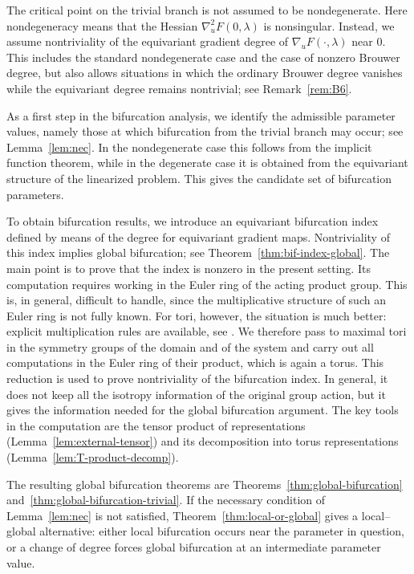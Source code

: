 \documentclass[reqno,twoside,12pt]{amsart}
\numberwithin{equation}{section} \errorcontextlines=0
\begin{document}
The critical point on the trivial branch is not assumed to be nondegenerate. Here nondegeneracy means that the Hessian $\nabla_u^2F(0,\lambda)$ is nonsingular. Instead, we assume nontriviality of the equivariant gradient degree of $\nabla_uF(\cdot,\lambda)$ near $0$. This includes the standard nondegenerate case and the case of nonzero Brouwer degree, but also allows situations in which the ordinary Brouwer degree vanishes while the equivariant degree remains nontrivial; see Remark~\ref{rem:B6}.

As a first step in the bifurcation analysis, we identify the admissible parameter values, namely those at which bifurcation from the trivial branch may occur; see Lemma~\ref{lem:nec}. In the nondegenerate case this follows from the implicit function theorem, while in the degenerate case it is obtained from the equivariant structure of the linearized problem. This gives the candidate set of bifurcation parameters.

To obtain bifurcation results, we introduce an equivariant bifurcation index defined by means of the degree for equivariant gradient maps. Nontriviality of this index implies global bifurcation; see Theorem~\ref{thm:bif-index-global}. The main point is to prove that the index is nonzero in the present setting. Its computation requires working in the Euler ring of the acting product group. This is, in general, difficult to handle, since the multiplicative structure of such an Euler ring is not fully known. For tori, however, the situation is much better: explicit multiplication rules are available, see \cite{GarRyb}. We therefore pass to maximal tori in the symmetry groups of the domain and of the system and carry out all computations in the Euler ring of their product, which is again a torus. This reduction is used to prove nontriviality of the bifurcation index. In general, it does not keep all the isotropy information of the original group action, but it gives the information needed for the global bifurcation argument. The key tools in the computation are the tensor product of representations (Lemma~\ref{lem:external-tensor}) and its decomposition into torus representations (Lemma~\ref{lem:T-product-decomp}).

The resulting global bifurcation theorems are Theorems~\ref{thm:global-bifurcation} and~\ref{thm:global-bifurcation-trivial}. If the necessary condition of Lemma~\ref{lem:nec} is not satisfied, Theorem~\ref{thm:local-or-global} gives a local--global alternative: either local bifurcation occurs near the parameter in question, or a change of degree forces global bifurcation at an intermediate parameter value.
\end{document}
